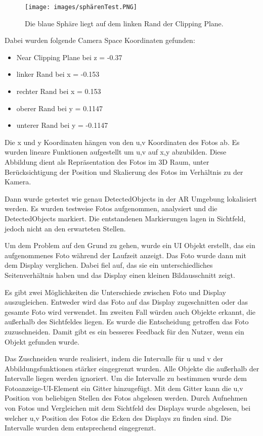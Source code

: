 \begin{figure}[H]
	\centering
	\texttt{[image: images/sphärenTest.PNG]}
	\caption[Ränder der Near Clipping Plane in Unity finden]{Die blaue Sphäre liegt auf dem linken Rand der Clipping Plane.}
	\label{illustration:speretest}
\end{figure}

Dabei wurden folgende Camera Space Koordinaten gefunden:
\begin{itemize}
	\item Near Clipping Plane bei z = -0.37
	\item linker Rand bei x = -0.153
	\item rechter Rand bei x = 0.153
	\item oberer Rand bei y = 0.1147
	\item unterer Rand bei y = -0.1147
\end{itemize}

Die x und y Koordinaten hängen von den u,v Koordinaten des Fotos ab. Es wurden lineare Funktionen aufgestellt um u,v auf x,y abzubilden. Diese Abbildung dient als Repräsentation des Fotos im 3D Raum, unter Berücksichtigung der Position und Skalierung des Fotos im Verhältnis zu der Kamera.

Dann wurde getestet wie genau DetectedObjects in der AR Umgebung lokalisiert werden. Es wurden testweise Fotos aufgenommen, analysiert und die DetectedObjects markiert. Die entstandenen Markierungen lagen in Sichtfeld, jedoch nicht an den erwarteten Stellen. 

Um dem Problem auf den Grund zu gehen, wurde ein UI Objekt erstellt, das ein aufgenommenes Foto während der Laufzeit anzeigt.
Das Foto wurde dann mit dem Display verglichen. Dabei fiel auf, das sie ein unterschiedliches Seitenverhältnis haben und das Display einen kleinen Bildausschnitt zeigt.  

Es gibt zwei Möglichkeiten die Unterschiede zwischen Foto und Display auszugleichen. Entweder wird das Foto auf das Display zugeschnitten oder das gesamte Foto wird verwendet. Im zweiten Fall würden auch Objekte erkannt, die außerhalb des Sichtfeldes liegen.
Es wurde die Entscheidung getroffen das Foto zuzuschneiden. Damit gibt es ein besseres Feedback für den Nutzer, wenn ein Objekt gefunden wurde. 

Das Zuschneiden wurde realisiert, indem die Intervalle für u und v der Abbildungsfunktionen stärker eingegrenzt wurden. Alle Objekte die außerhalb der Intervalle liegen werden ignoriert. Um die Intervalle zu bestimmen wurde dem Fotoanzeige-UI-Element ein Gitter hinzugefügt. Mit dem Gitter kann die u,v Position von beliebigen Stellen des Fotos abgelesen werden. 
Durch Aufnehmen von Fotos und Vergleichen mit dem Sichtfeld des Displays wurde abgelesen, bei welcher u,v Position des Fotos die Ecken des Displays zu finden sind. Die Intervalle wurden dem entsprechend eingegrenzt. 

